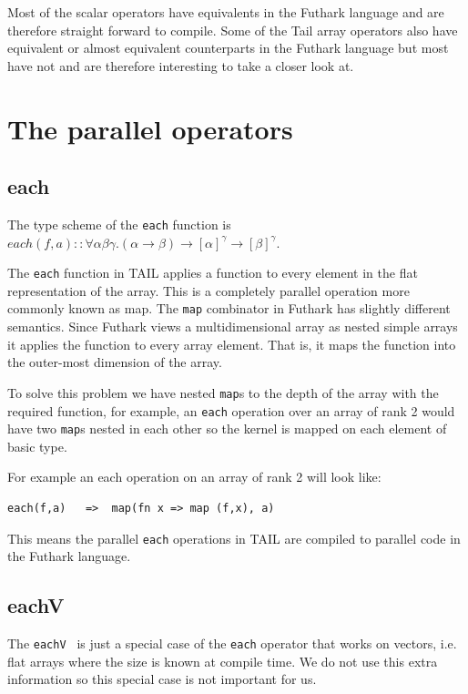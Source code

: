 \documentclass[11pt]{article}
\begin{document}
Most of the scalar operators have equivalents in the Futhark language and are therefore straight forward to compile.
Some of the Tail array operators also have equivalent or almost equivalent counterparts in the Futhark language
but most have not and are therefore interesting to take a closer look at.


\section{The parallel operators}

\subsection{each}

The type scheme of the {\tt each} function is $each(f,a) :: \forall\alpha\beta\gamma.(\alpha \to \beta) \to [\alpha]^\gamma \to [\beta]^\gamma$.

The {\tt each} function in TAIL applies a function to every element in the flat representation of the array.
This is a completely parallel operation more commonly known as map.
The {\tt map} combinator in Futhark has slightly different semantics\cite{ElsmanDybdal:Array:2014}.
Since Futhark views a multidimensional array as nested simple arrays it applies the function to every array element.
That is, it maps the function into the outer-most dimension of the array\cite{TroelsHenriksen}.

To solve this problem we have nested {\tt map}s to the depth of the array with the required function,
for example, an {\tt each} operation over an array of rank 2 would have two {\tt map}s nested in each other so the kernel is
mapped on each element of basic type.

For example an each operation on an array of rank 2 will look like:
\begin{lstlisting}[numbers=none,frame=none]
each(f,a)	=>	map(fn x => map (f,x), a)
\end{lstlisting}

This means the parallel {\tt each} operations in TAIL are compiled to parallel code in the Futhark language.

\subsection{eachV}
The {\tt eachV } is just a special case of the {\tt each} operator that works on vectors, i.e. flat arrays where the size
is known at compile time. We do not use this extra information so this special case is not important for us.
\end{document}
